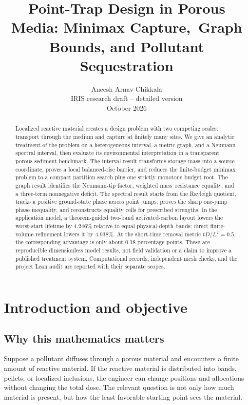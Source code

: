 \documentclass[10pt]{article}
\title{Point-Trap Design in Porous Media: Minimax Capture,\ Graph Bounds, and Pollutant Sequestration}
\author{Aneesh Arnav Chikkala\\\small IRIS research draft -- detailed version\\\small October 2026}
\date{}
\begin{document}
\maketitle

\begin{abstract}
Localized reactive material creates a design problem with two competing scales: transport through the medium and capture at finitely many sites. We give an analytic treatment of the problem on a heterogeneous interval, a metric graph, and a Neumann spectral interval, then evaluate its environmental interpretation in a transparent porous-sediment benchmark. The interval result transforms storage mass into a source coordinate, proves a local balanced-rise barrier, and reduces the finite-budget minimax problem to a compact partition search plus one strictly monotone budget root. The graph result identifies the Neumann-tip factor, weighted mass--resistance equality, and a three-term nonnegative deficit. The spectral result starts from the Rayleigh quotient, tracks a positive ground-state phase across point jumps, proves the sharp one-jump phase inequality, and reconstructs equality cells for prescribed strengths. In the application model, a theorem-guided two-band activated-carbon layout lowers the worst-start lifetime by 4.246\% relative to equal physical-depth bands; direct finite-volume refinement lowers it by 4.938\%. At the short-time removal metric $tD/L^2=0.5$, the corresponding advantage is only about 0.18 percentage points. These are reproducible dimensionless model results, not field validation or a claim to improve a published treatment system. Computational records, independent mesh checks, and the project Lean audit are reported with their separate scopes.
\end{abstract}

\section{Introduction and objective}

\subsection{Why this mathematics matters}

Suppose a pollutant diffuses through a porous material and encounters a finite amount of reactive material. If the reactive material is distributed into bands, pellets, or localized inclusions, the engineer can change positions and allocations without changing the total dose. The relevant question is not only how much material is present, but how the least favorable starting point sees the material.
\end{document}
